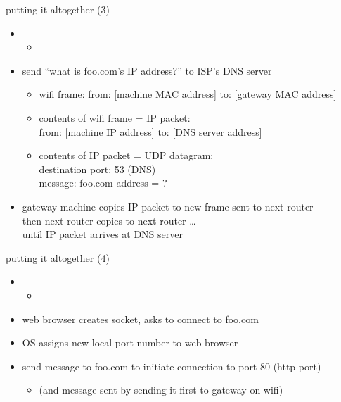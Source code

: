 \begin{frame}{putting it altogether (3)}
    \begin{itemize}
    \item {}
        \begin{itemize}
        \item {}
        \end{itemize}
    \vspace{.5cm}
    \item<2-> send ``what is foo.com's IP address?'' to ISP's DNS server
        \begin{itemize}
        \item wifi frame: from: [machine MAC address] to: [gateway MAC address]
        \item contents of wifi frame = IP packet: \\
              from: [machine IP address] to: [DNS server address]
        \item contents of IP packet = UDP datagram: \\
              destination port: 53 (DNS) \\
              message: foo.com address = ?
        \end{itemize}
    \item<2-> gateway machine copies IP packet to new frame sent to next router \\
              then next router copies to next router \ldots \\
              until IP packet arrives at DNS server
    \end{itemize}
\end{frame}

\begin{frame}{putting it altogether (4)}
    \begin{itemize}
    \item {}
        \begin{itemize}
        \item {}
        \end{itemize}
    \vspace{.5cm}
    \item web browser creates socket, asks to connect to foo.com
    \item OS assigns new local port number to web browser
    \item send message to foo.com to initiate connection to port 80 (http port)
        \begin{itemize}
        \item (and message sent by sending it first to gateway on wifi)
        \end{itemize}
    \end{itemize}
\end{frame}

